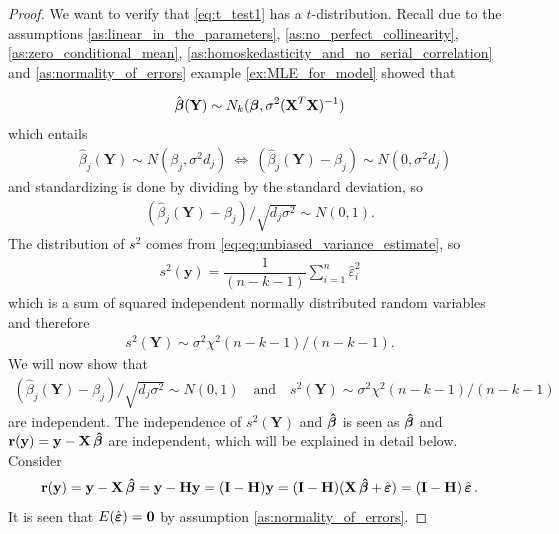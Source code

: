 \begin{proof}
We want to verify that \eqref{eq:t_test1} has a $t$-distribution. Recall due to the assumptions \ref{as:linear_in_the_parameters}, \ref{as:no_perfect_collinearity}, \ref{as:zero_conditional_mean}, \ref{as:homoskedasticity_and_no_serial_correlation} and \ref{as:normality_of_errors} example \ref{ex:MLE_for_model} showed that

\begin{align} \label{eq:th_t_test}
    \hat{\operatorname{\boldsymbol{\beta}}}(\textbf{Y}) \sim N_k(\operatorname{\boldsymbol{\beta}},\sigma^2(\textbf{X}^T\textbf{X})^{-1})
\end{align}
which entails
\begin{align*}
    &\hat{\beta}_j(\textbf{Y})\sim N(\beta_j , \sigma^2d_j) \
    \Leftrightarrow \  (\hat{\beta}_j(\textbf{Y})-\beta_j) \sim N(0,\sigma^2d_j)
\end{align*}
and standardizing is done by dividing by the standard deviation, so
\begin{align*}
    (\hat{\beta}_j(\textbf{Y})-\beta_j)/\sqrt{d_j\sigma^2} \sim N(0,1).
\end{align*}
The distribution of $s^2$ comes from \eqref{eq:eq:unbiased_variance_estimate}, so
\begin{align} \label{eq:sigma_square_of_Y}
    s^2(\textbf{y}) = \dfrac{1}{(n-k-1)}\sum_{i=1}^n \hat{\varepsilon}_i^2
\end{align}
which is a sum of squared independent normally distributed random variables and therefore
\begin{align*}
s^2(\textbf{Y}) \sim \sigma^2 \chi^2(n-k-1)/(n-k-1).    
\end{align*}
We will now show that
\begin{align*}
    (\hat{\beta}_j(\textbf{Y})-\beta_j)/\sqrt{d_j\sigma^2} \sim N(0,1) \quad \text{and} \quad s^2(\textbf{Y}) \sim \sigma^2\chi^2 (n-k-1)/(n-k-1)
\end{align*}
are independent.
The independence of $s^2(\textbf{Y})$ and $\operatorname{\boldsymbol{\hat{\beta}}}$ is seen as $\operatorname{\boldsymbol{\hat{\beta}}}$ and $\textbf{r}(\textbf{y}) = \textbf{y} -\textbf{X} \operatorname{\boldsymbol{\hat{\beta}}}$ are independent, which will be explained in detail below.
Consider
\begin{align*}
    \textbf{r}(\textbf{y}) = \textbf{y}-\textbf{X} \operatorname{\boldsymbol{\hat{\beta}}} = \textbf{y} - \textbf{H} \textbf{y} = (\textbf{I}-\textbf{H})\textbf{y} = (\textbf{I}-\textbf{H}) (\textbf{X} \operatorname{\boldsymbol{\hat{\beta}}} + \operatorname{\hat{\boldsymbol{\varepsilon}}}) = (\textbf{I} - \textbf{H}) \operatorname{\hat{\boldsymbol{\varepsilon}}}.
\end{align*}
It is seen that $E(\operatorname{\hat{\boldsymbol{\varepsilon}}}) = \textbf{0}$ by assumption \ref{as:normality_of_errors}. 

\end{proof}

